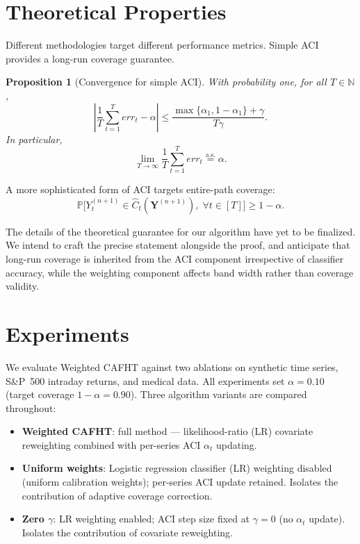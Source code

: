 \documentclass{article}
\newtheorem{proposition}{Proposition}[section]
\numberwithin{equation}{section}
\begin{document}
\section{Theoretical Properties}

Different methodologies target different performance metrics. Simple ACI provides a long-run coverage guarantee.

\begin{proposition}[Convergence for simple ACI]
With probability one, for all $T \in \mathbb{N}$,
\[
\left| \frac{1}{T} \sum_{t=1}^T err_t - \alpha \right|
\le
\frac{\max\{\alpha_1, 1 - \alpha_1\} + \gamma}{T \gamma}.
\]
In particular,
\[
\lim_{T \to \infty} \frac{1}{T} \sum_{t=1}^T err_t \overset{\text{a.s.}}{=} \alpha.
\]
\end{proposition}

A more sophisticated form of ACI targets entire-path coverage:
\[
\mathbb{P}\bigl[ Y_t^{(n+1)} \in \hat{C}_t(\mathbf{Y}^{(n+1)}), \; \forall t \in [T] \bigr] \ge 1 - \alpha.
\]

The details of the theoretical guarantee for our algorithm have yet to be finalized. We intend to craft the precise statement alongside the proof, and anticipate that long-run coverage is inherited from the ACI component irrespective of classifier accuracy, while the weighting component affects band width rather than coverage validity.

\section{Experiments}
\label{sec:experiments}

We evaluate Weighted CAFHT against two ablations on synthetic time series, S\&P~500 intraday returns, and medical data. All experiments set $\alpha = 0.10$ (target
coverage $1 - \alpha = 0.90$). Three algorithm variants are compared
throughout:
%
\begin{itemize}
  \item \textbf{Weighted CAFHT}: full method — likelihood-ratio (LR) covariate
        reweighting combined with per-series ACI $\alpha_t$ updating.
  \item \textbf{Uniform weights}: Logistic regression classifier (LR) weighting disabled (uniform calibration
        weights); per-series ACI update retained. Isolates the contribution of
        adaptive coverage correction.
  \item \textbf{Zero $\gamma$}: LR weighting enabled; ACI step size fixed at
        $\gamma = 0$ (no $\alpha_t$ update). Isolates the contribution of
        covariate reweighting.
\end{itemize}
\end{document}
